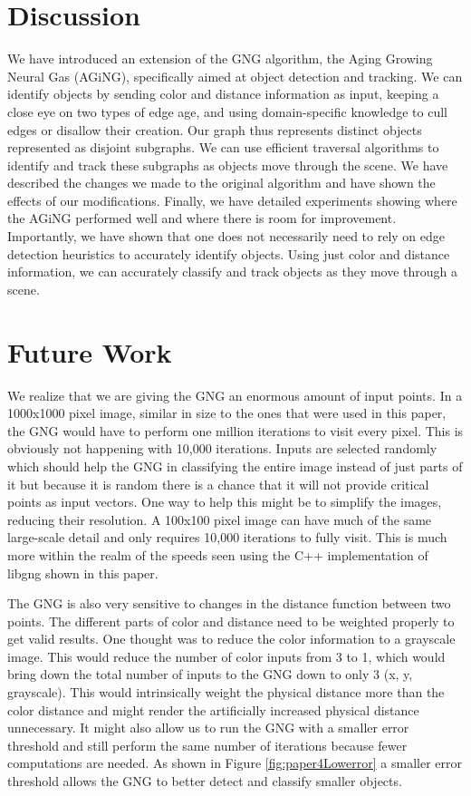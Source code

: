 \documentclass{article}
\renewcommand{\|}{\origbar} %
\begin{document}
\section{Discussion}
\label{sec:discussion}

We have introduced an extension of the GNG algorithm, the Aging Growing Neural Gas (AGiNG), specifically aimed at  object detection and tracking. We can identify objects by sending color and distance information as input, keeping a close eye on two types of edge age, and using domain-specific knowledge to cull edges or disallow their creation. Our graph thus represents distinct objects represented as disjoint subgraphs. We can use efficient traversal algorithms to identify and track these subgraphs as objects move through the scene. We have described the changes we made to the original algorithm and have shown the effects of our modifications. Finally, we have detailed experiments showing where the AGiNG performed well and where there is room for improvement. Importantly, we have shown that one does not necessarily need to rely on edge detection heuristics to accurately identify objects. Using just color and distance information, we can accurately classify and track objects as they move through a scene.

\section{Future Work}
\label{sec:future}

We realize that we are giving the GNG an enormous amount of input points. In a 1000x1000 pixel image, similar in size to the ones that were used in this paper, the GNG would have to perform one million iterations to visit every pixel. This is obviously not happening with 10,000 iterations. Inputs are selected randomly which should help the GNG in classifying the entire image instead of just parts of it but because it is random there is a chance that it will not provide critical points as input vectors. One way to help this might be to simplify the images, reducing their resolution. A 100x100 pixel image can have much of the same large-scale detail and only requires 10,000 iterations to fully visit. This is much more within the realm of the speeds seen using the C++ implementation of libgng shown in this paper.

The GNG is also very sensitive to changes in the distance function between two points. The different parts of color and distance need to be weighted properly to get valid results. One thought was to reduce the color information to a grayscale image. This would reduce the number of color inputs from 3 to 1, which would bring down the total number of inputs to the GNG down to only 3 (x, y, grayscale). This would intrinsically weight the physical distance more than the color distance and might render the artificially increased physical distance unnecessary. It might also allow us to run the GNG with a smaller error threshold and still perform the same number of iterations because fewer computations are needed. As shown in Figure \ref{fig:paper4Lowerror} a smaller error threshold allows the GNG to better detect and classify smaller objects.
\end{document}
